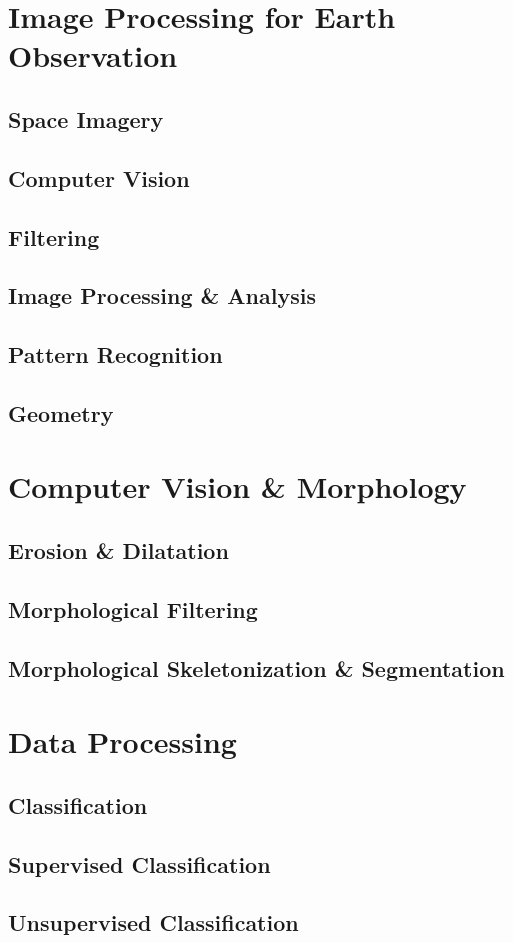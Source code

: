 \section{Image Processing for Earth Observation}

\subsection{Space Imagery}

\subsection{Computer Vision}

\subsection{Filtering}

\subsection{Image Processing \& Analysis}

\subsection{Pattern Recognition}

\subsection{Geometry}


\section{Computer Vision \& Morphology}

\subsection{Erosion \& Dilatation}

\subsection{Morphological Filtering}

\subsection{Morphological Skeletonization \& Segmentation}


\section{Data Processing}

\subsection{Classification}

\subsection{Supervised Classification}

\subsection{Unsupervised Classification}
